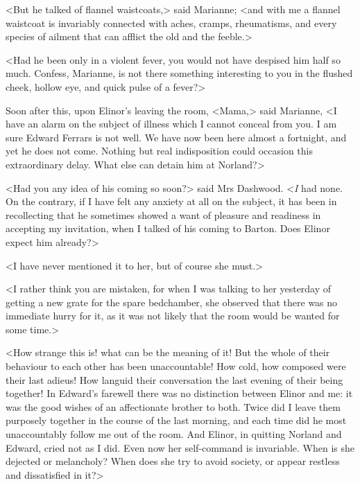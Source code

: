 <But he talked of flannel waistcoats,> said Marianne; <and with me a flannel waistcoat is invariably connected with aches, cramps, rheumatisms, and every species of ailment that can afflict the old and the feeble.>

<Had he been only in a violent fever, you would not have despised him half so much. Confess, Marianne, is not there something interesting to you in the flushed cheek, hollow eye, and quick pulse of a fever?>

Soon after this, upon Elinor's leaving the room, <Mama,> said Marianne, <I have an alarm on the subject of illness which I cannot conceal from you. I am sure Edward Ferrars is not well. We have now been here almost a fortnight, and yet he does not come. Nothing but real indisposition could occasion this extraordinary delay. What else can detain him at Norland?>

<Had you any idea of his coming so soon?> said Mrs Dashwood. <\textit{I} had none. On the contrary, if I have felt any anxiety at all on the subject, it has been in recollecting that he sometimes showed a want of pleasure and readiness in accepting my invitation, when I talked of his coming to Barton. Does Elinor expect him already?>

<I have never mentioned it to her, but of course she must.>

<I rather think you are mistaken, for when I was talking to her yesterday of getting a new grate for the spare bedchamber, she observed that there was no immediate hurry for it, as it was not likely that the room would be wanted for some time.>

<How strange this is! what can be the meaning of it! But the whole of their behaviour to each other has been unaccountable! How cold, how composed were their last adieus! How languid their conversation the last evening of their being together! In Edward's farewell there was no distinction between Elinor and me: it was the good wishes of an affectionate brother to both. Twice did I leave them purposely together in the course of the last morning, and each time did he most unaccountably follow me out of the room. And Elinor, in quitting Norland and Edward, cried not as I did. Even now her self-command is invariable. When is she dejected or melancholy? When does she try to avoid society, or appear restless and dissatisfied in it?>